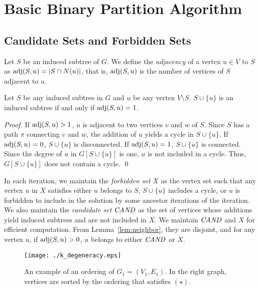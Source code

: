 \documentclass{llncs}
\newcommand{\name}[1]{\textit{#1}}
\newcommand{\set}[1]{\{#1\}}
\newcommand{\Can}{{\it CAND}}
\newcommand{\adj}{{\rm adj}}
\begin{document}
\section{Basic Binary Partition Algorithm}
\label{sec:algorithm}


\subsection{Candidate Sets and Forbidden Sets}
\label{subsec:can}

Let $S$ be an induced subtree of $G$. 
We define the \name{adjacency} of a vertex $u \in V$ to $S$ 
as $\adj(S, u) = |S\cap N(u)|$, 
that is, $\adj(S, u)$ is the number of vertices of $S$ adjacent to $u$. 

\begin{lemma}
    \label{lem:neighbor}
    Let $S$ be any induced subtree in $G$ and $u$ be any vertex $V \setminus S$. 
    $S \cup \set{u}$ is an induced subtree if and only if $\adj(S, u) = 1$. 
\end{lemma}

\begin{proof}
    If $\adj(S, u) > 1$, 
    $u$ is adjacent to two vertices $v$ and $w$ of $S$. 
    Since $S$ has a path $\pi$ connecting $v$ and $w$, 
    the addition of $u$ yields a cycle in $S\cup\set{u}$. 
    If $\adj(S, u) = 0$, $S\cup\set{u}$ is disconnected. 
    If $\adj(S, u) = 1$, $S\cup\set{u}$ is connected. 
    Since the degree of $u$ in $G[S\cup\set{u}]$ is one, 
    $u$ is not included in a cycle. 
    Thus, $G[S\cup\set{u}]$ does not contain a cycle. 
    \qed
\end{proof}

In each iteration, 
we maintain the \name{forbidden set} $X$ 
as the vertex set such that any vertex $u$ in $X$ 
satisfies either $u$ belongs to $S$, 
$S\cup\set{u}$ includes a cycle, 
or $u$ is forbidden to include in the solution by some ancestor iterations of the iteration.  
We also maintain the \name{candidate set} $\Can$ 
as the set of vertices whose additions yield induced subtrees and are not included in $X$. 
We maintain $\Can$ and $X$ for efficient computation. 
From Lemma~\ref{lem:neighbor}, 
they are disjoint, 
and for any vertex $u$, 
if $\adj(S, u) > 0$, 
$u$ belongs to either $\Can$ or $X$. 

\begin{figure}[!t]
    \begin{center}
        \texttt{[image: ./k\_degeneracy.eps]}
        \caption{
            An example of an ordering of $G_1 = (V_1, E_1)$. 
In the right graph, 
            vertices are sorted by the ordering that satisfies $(\star)$. 
\label{img:k:degeneracy}}
    \end{center}
\end{figure}
\end{document}
